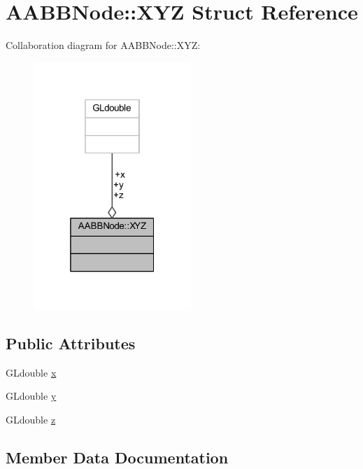 \hypertarget{struct_a_a_b_b_node_1_1_x_y_z}{}\section{A\+A\+B\+B\+Node\+:\+:X\+YZ Struct Reference}
\label{struct_a_a_b_b_node_1_1_x_y_z}


Collaboration diagram for A\+A\+B\+B\+Node\+:\+:X\+YZ\+:
\nopagebreak
\begin{figure}[H]
\begin{center}
\leavevmode
\includegraphics[width=169pt]{struct_a_a_b_b_node_1_1_x_y_z__coll__graph}
\end{center}
\end{figure}
\subsection*{Public Attributes}
\begin{DoxyCompactItemize}
\item 
G\+Ldouble \hyperlink{struct_a_a_b_b_node_1_1_x_y_z_acae492ce70ffac4fadc0ac896e6eb3dd}{x}
\item 
G\+Ldouble \hyperlink{struct_a_a_b_b_node_1_1_x_y_z_aabe6ebb872838d5d7cd6f9535be750bb}{y}
\item 
G\+Ldouble \hyperlink{struct_a_a_b_b_node_1_1_x_y_z_a5bde4ccc9a39dc20ede833ed64b51015}{z}
\end{DoxyCompactItemize}


\subsection{Member Data Documentation}
